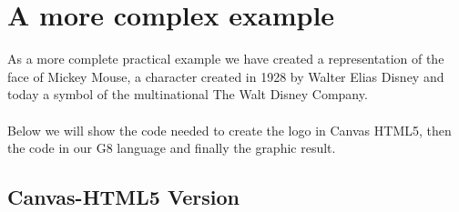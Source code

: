 \documentclass[a4paper]{article}
\begin{document}
\newpage


\section{A more complex example}

As a more complete practical example we have created a representation of the face of Mickey Mouse, a character created in 1928 by Walter Elias Disney and today a symbol of the multinational The Walt Disney Company.
\\
\\
Below we will show the code needed to create the logo in Canvas HTML5, then the code in our G8 language and finally the graphic result.

\subsection{Canvas-HTML5 Version}
\end{document}

